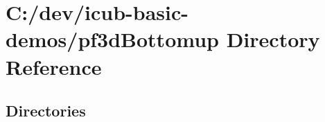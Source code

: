 \section{C\+:/dev/icub-\/basic-\/demos/pf3d\+Bottomup Directory Reference}
\label{dir_e676cb3644873b6bf7df3036a086e762}
\subsection*{Directories}
\begin{DoxyCompactItemize}
\end{DoxyCompactItemize}
